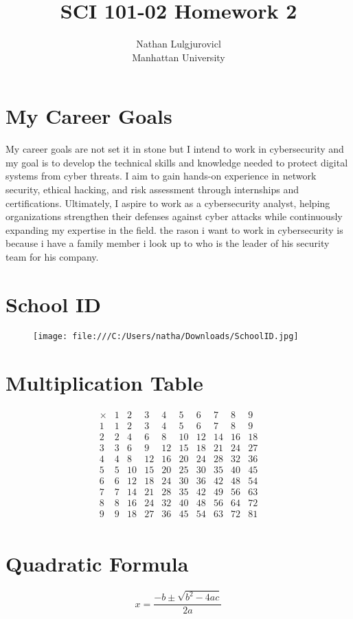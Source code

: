 \documentclass[11pt]{article}
\begin{document}
\title{SCI 101-02 Homework 2}
\author{Nathan Lulgjurovicl\\
Manhattan University}
\maketitle

\section {My Career Goals}

My career goals are not set it in stone but I intend to work in cybersecurity and my goal is to develop the technical skills and knowledge needed to protect digital systems from cyber threats. I aim to gain hands-on experience in network security, ethical hacking, and risk assessment through internships and certifications. Ultimately, I aspire to work as a cybersecurity analyst, helping organizations strengthen their defenses against cyber attacks while continuously expanding my expertise in the field. the rason i want to work in cybersecurity is because i have a family member i look up to who is the leader of his security team for his company.

\section {School ID}

\begin{figure}[!h]
\centering
\texttt{[image: file:///C:/Users/natha/Downloads/SchoolID.jpg]}
\end{figure}

\section{Multiplication Table}

\[
\begin{array}{c|ccccccccc}
\times & 1 & 2 & 3 & 4 & 5 & 6 & 7 & 8 & 9 \\
\hline
1 & 1 & 2 & 3 & 4 & 5 & 6 & 7 & 8 & 9 \\
2 & 2 & 4 & 6 & 8 & 10 & 12 & 14 & 16 & 18 \\
3 & 3 & 6 & 9 & 12 & 15 & 18 & 21 & 24 & 27 \\
4 & 4 & 8 & 12 & 16 & 20 & 24 & 28 & 32 & 36 \\
5 & 5 & 10 & 15 & 20 & 25 & 30 & 35 & 40 & 45 \\
6 & 6 & 12 & 18 & 24 & 30 & 36 & 42 & 48 & 54 \\
7 & 7 & 14 & 21 & 28 & 35 & 42 & 49 & 56 & 63 \\
8 & 8 & 16 & 24 & 32 & 40 & 48 & 56 & 64 & 72 \\
9 & 9 & 18 & 27 & 36 & 45 & 54 & 63 & 72 & 81 \\
\end{array}
\]

\section{Quadratic Formula}

\[
x = \frac{-b \pm \sqrt{b^2 - 4ac}}{2a}
\]
\end{document}
